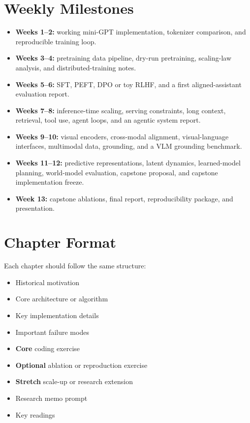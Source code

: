 \documentclass[11pt]{article}
\begin{document}
\section*{Weekly Milestones}

\begin{itemize}
    \item \textbf{Weeks 1--2:} working mini-GPT implementation, tokenizer comparison, and reproducible training loop.
    \item \textbf{Weeks 3--4:} pretraining data pipeline, dry-run pretraining, scaling-law analysis, and distributed-training notes.
    \item \textbf{Weeks 5--6:} SFT, PEFT, DPO or toy RLHF, and a first aligned-assistant evaluation report.
    \item \textbf{Weeks 7--8:} inference-time scaling, serving constraints, long context, retrieval, tool use, agent loops, and an agentic system report.
    \item \textbf{Weeks 9--10:} visual encoders, cross-modal alignment, visual-language interfaces, multimodal data, grounding, and a VLM grounding benchmark.
    \item \textbf{Weeks 11--12:} predictive representations, latent dynamics, learned-model planning, world-model evaluation, capstone proposal, and capstone implementation freeze.
    \item \textbf{Week 13:} capstone ablations, final report, reproducibility package, and presentation.
\end{itemize}

\section*{Chapter Format}

Each chapter should follow the same structure:

\begin{itemize}
    \item Historical motivation
    \item Core architecture or algorithm
    \item Key implementation details
    \item Important failure modes
    \item \textbf{Core} coding exercise
    \item \textbf{Optional} ablation or reproduction exercise
    \item \textbf{Stretch} scale-up or research extension
    \item Research memo prompt
    \item Key readings
\end{itemize}
\end{document}
